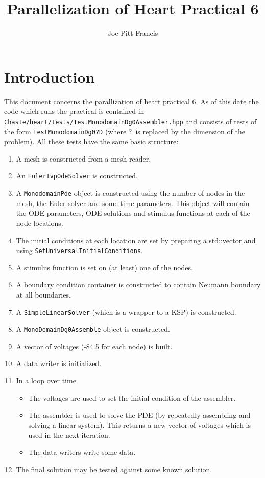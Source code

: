 \documentclass{article}
\author{Joe Pitt-Francis}
\title{Parallelization of Heart Practical 6}
\begin{document}
\maketitle
\section{Introduction}

This document concerns the parallization of heart practical 6.  As of
this date the code which runs the practical is contained in {\tt
Chaste/heart/tests/TestMonodomainDg0Assembler.hpp} and consists of tests
of the form {\tt testMonodomainDg0?D} (where ?\ is replaced by the
dimension of the problem).  All these tests have the same basic
structure:
\begin{enumerate}
\item
A mesh is constructed from a mesh reader.
\item 
An {\tt EulerIvpOdeSolver} is constructed.
\item 
A {\tt MonodomainPde} object is constructed using the number of
nodes in the mesh, the Euler solver and some time parameters.  This
object will contain the ODE parameters, ODE solutions and stimulus
functions at each of the node locations.
\item
The initial conditions at each location are set by preparing a std::vector
and using {\tt SetUniversalInitialConditions}.
\item
A stimulus function is set on (at least) one of the nodes.
\item
A boundary condition container is constructed to contain Neumann
boundary at all boundaries.
\item
A {\tt SimpleLinearSolver} (which is a wrapper to a KSP) is
constructed.
\item A {\tt MonoDomainDg0Assemble} object is constructed.
\item A vector of voltages (-84.5  for each node) is built.
\item A data writer is initialized.
\item In a loop over time
\begin{itemize}
\item The voltages are used to set the initial condition of the
assembler.
\item The assembler is used to solve the PDE (by repeatedly assembling
and solving a linear system). This returns a new vector of voltages
which is used in the next iteration.
\item The data writers write some data.
\end{itemize}
\item The final solution may be tested against some known solution.
\end{enumerate}
\end{document}
